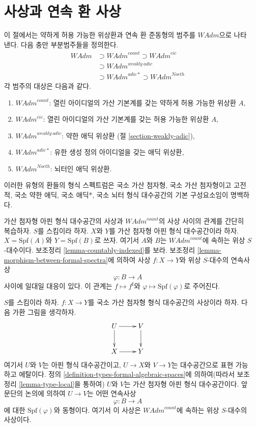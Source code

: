 \section{사상과 연속 환 사상}
\label{section-morphisms-rings}

\noindent
이 절에서는 약하게 허용 가능한 위상환과 연속 환 준동형의 범주를
$\textit{WAdm}$으로 나타낸다. 다음 충만 부분범주들을 정의한다.
$$
\begin{aligned}
\textit{WAdm} &\supset
\textit{WAdm}^{count} \supset
\textit{WAdm}^{cic} \\
&\supset \textit{WAdm}^{weakly\ adic} \\
&\supset \textit{WAdm}^{adic*} \supset
\textit{WAdm}^{Noeth}
\end{aligned}
$$
각 범주의 대상은 다음과 같다.
\begin{enumerate}
\item $\textit{WAdm}^{count}$: 열린 아이디얼의 가산 기본계를 갖는
약하게 허용 가능한 위상환 $A$,
\item $\textit{WAdm}^{cic}$: 열린 아이디얼의 가산 기본계를 갖는
허용 가능한 위상환 $A$,
\item $\textit{WAdm}^{weakly\ adic}$: 약한 애딕 위상환
(절 \ref{section-weakly-adic}),
\item $\textit{WAdm}^{adic*}$: 유한 생성 정의 아이디얼을 갖는 애딕
위상환,
\item $\textit{WAdm}^{Noeth}$: 뇌터인 애딕 위상환.
\end{enumerate}
이러한 유형의 환들의 형식 스펙트럼은 국소 가산 첨자형, 국소 가산
첨자형이고 고전적, 국소 약한 애딕, 국소 애딕*, 국소 뇌터 형식
대수공간의 기본 구성요소임이 명백하다.

\medskip\noindent
가산 첨자형 아핀 형식 대수공간의 사상과 $\textit{WAdm}^{count}$의
사상 사이의 관계를 간단히 복습하자. $S$를 스킴이라 하자. $X$와
$Y$를 가산 첨자형 아핀 형식 대수공간이라 하자.
$X = \text{Spf}(A)$와 $Y = \text{Spf}(B)$로 쓰자. 여기서 $A$와
$B$는 $\textit{WAdm}^{count}$에 속하는 위상 $S$-대수이다. %
보조정리 \ref{lemma-countably-indexed}를 보라. 보조정리
\ref{lemma-morphism-between-formal-spectra}에 의하여 사상
$f : X \to Y$와 위상 $S$-대수의 연속사상
$$
\varphi : B \longrightarrow A
$$
사이에 일대일 대응이 있다. 이 관계는
$f \mapsto f^\sharp$와 $\varphi \mapsto \text{Spf}(\varphi)$로
주어진다.

\medskip\noindent
$S$를 스킴이라 하자. $f : X \to Y$를 국소 가산 첨자형 형식
대수공간의 사상이라 하자. 다음 가환 그림을 생각하자.
$$
\xymatrix{
U \ar[d] \ar[r] & V \ar[d] \\
X \ar[r] & Y
}
$$
여기서 $U$와 $V$는 아핀 형식 대수공간이고, $U \to X$와
$V \to Y$는 대수공간으로 표현 가능하고 에탈이다. 정의
\ref{definition-types-formal-algebraic-spaces}에 의하여(따라서 보조정리
\ref{lemma-type-local}을 통하여) $U$와 $V$는 가산 첨자형 아핀 형식
대수공간이다. 앞 문단의 논의에 의하여 $U \to V$는 어떤
연속사상
$$
\varphi : B \longrightarrow A
$$
에 대한 $\text{Spf}(\varphi)$와 동형이다. 여기서 이 사상은
$\textit{WAdm}^{count}$에 속하는 위상 $S$-대수의 사상이다.

